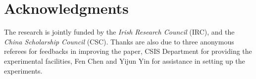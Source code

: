 \documentclass[10pt]{article}
\begin{document}
\section*{Acknowledgments}\label{sec:ack} The research is jointly funded by the \textit{Irish Research Council}
(IRC), and the \textit{China Scholarship Council} (CSC). 
Thanks are also due to three anonymous referees for feedbacks in improving 
the paper, CSIS Department for providing the experimental facilities, Fen Chen and 
Yijun Yin for assistance in setting up the experiments.




\end{document}
